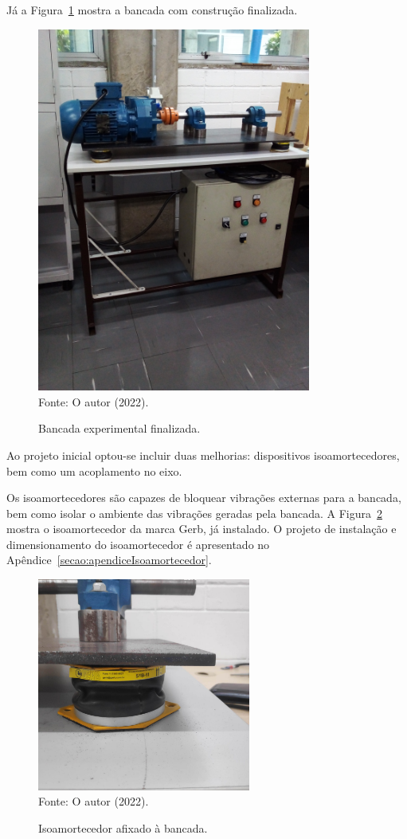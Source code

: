 \documentclass[
	12pt,				
	oneside,			
	a4paper,			
	english,			
	brazil,			
	]{abntex2ppgsi}
\begin{document}
Já a Figura~\ref{bancada_completa} mostra a bancada com construção finalizada.

\begin{figure}[H]
\centering
\caption {Bancada experimental finalizada.}
\includegraphics[width=\textwidth,height=120mm,keepaspectratio,angle=-90]{bancada_completa} \\
Fonte: O autor (2022).
\label{bancada_completa}
\end{figure}

Ao projeto inicial optou-se incluir duas melhorias: dispositivos isoamortecedores, bem como um acoplamento no eixo.

Os isoamortecedores são capazes de bloquear vibrações externas para a bancada, bem como isolar o ambiente das vibrações geradas pela bancada. A Figura~\ref{isoamortecedor_bancada} mostra o isoamortecedor da marca Gerb, já instalado. O projeto de instalação e dimensionamento do isoamortecedor é apresentado no Apêndice~\ref{secao:apendiceIsoamortecedor}. 
 
\begin{figure}[H]
\centering
\caption {Isoamortecedor afixado à bancada.}
\includegraphics[width=\textwidth,height=70mm,keepaspectratio]{isoamortecedor_bancada} \\
Fonte: O autor (2022).
\label{isoamortecedor_bancada}
\end{figure}
\end{document}
